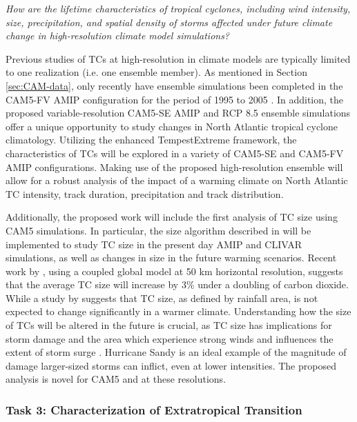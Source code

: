 \documentclass[11pt]{article}
\begin{document}
\emph{How are the lifetime characteristics of tropical cyclones, including wind intensity, size, precipitation, and spatial density of storms affected under future climate change in high-resolution climate model simulations?}

Previous studies of TCs at high-resolution in climate models are typically limited to one realization (i.e. one ensemble member). As mentioned in Section \ref{sec:CAM-data}, only recently have ensemble simulations been completed in the CAM5-FV AMIP configuration for the period of 1995 to 2005 \citep{Wehner2014}. In addition, the proposed variable-resolution CAM5-SE AMIP and RCP 8.5 ensemble simulations offer a unique opportunity to study changes in North Atlantic tropical cyclone climatology. Utilizing the enhanced TempestExtreme framework, the characteristics of TCs will be explored in a variety of CAM5-SE and CAM5-FV AMIP configurations. Making use of the proposed high-resolution ensemble will allow for a robust analysis of the impact of a warming climate on North Atlantic TC intensity, track duration, precipitation and track distribution. 

Additionally, the proposed work will include the first analysis of TC size using CAM5 simulations. In particular, the size algorithm described in \cite{Chavas2014} will be implemented to study TC size in the present day AMIP and CLIVAR simulations, as well as changes in size in the future warming scenarios. Recent work by \citet{Kim2014}, using a coupled global model at 50 km horizontal resolution, suggests that the average TC size will increase by 3\% under a doubling of carbon dioxide. While a study by \citet{Lin2015} suggests that TC size, as defined by rainfall area, is not expected to change significantly in a warmer climate. Understanding how the size of TCs will be altered in the future is crucial, as TC size has implications for storm damage and the area which experience strong winds and influences the extent of storm surge \citep{Powell2007}. Hurricane Sandy is an ideal example of the magnitude of damage larger-sized storms can inflict, even at lower intensities. The proposed analysis is novel for CAM5 and at these resolutions.
 
\subsubsection{Task 3: Characterization of Extratropical Transition}
\end{document}
